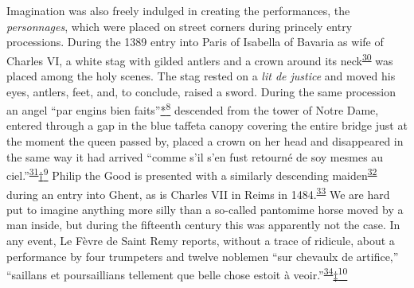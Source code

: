 Imagination was also freely indulged in creating the performances, the
\emph{personnages}, which were placed on street corners during princely
entry processions. During the 1389 entry into Paris of Isabella of
Bavaria as wife of Charles VI, a white stag with gilded antlers and a
crown around its
neck\textsuperscript{\protect\hypertarget{20_ILLUSTRATIONS_FOLLOW_PAGE.xhtmlux5cux23id_413}{\protect\hyperlink{23_NOTES.xhtmlux5cux23id_414}{30}}}
was placed among the holy scenes. The stag rested on a \emph{lit de
justice} and moved his eyes, antlers, feet, and, to conclude, raised a
sword. During the same procession an angel ``par engins bien
faits''\protect\hypertarget{20_ILLUSTRATIONS_FOLLOW_PAGE.xhtmlux5cux23id_2669}{\protect\hyperlink{23_NOTES.xhtmlux5cux23id_2670}{*\textsuperscript{8}}}
descended from the tower of Notre Dame, entered through a gap in the
blue taffeta canopy covering the entire bridge just at the moment the
queen passed by, placed a crown on her head and disappeared in the same
way it had arrived ``comme s'il s'en fust retourné de soy mesmes au
ciel.''\textsuperscript{\protect\hypertarget{20_ILLUSTRATIONS_FOLLOW_PAGE.xhtmlux5cux23id_411}{\protect\hyperlink{23_NOTES.xhtmlux5cux23id_412}{31}}}\protect\hypertarget{20_ILLUSTRATIONS_FOLLOW_PAGE.xhtmlux5cux23id_2671}{\protect\hyperlink{23_NOTES.xhtmlux5cux23id_2672}{†\textsuperscript{9}}}
Philip the Good is presented with a similarly descending
maiden\textsuperscript{\protect\hypertarget{20_ILLUSTRATIONS_FOLLOW_PAGE.xhtmlux5cux23id_409}{\protect\hyperlink{23_NOTES.xhtmlux5cux23id_410}{32}}}
during an entry into Ghent, as is Charles VII in Reims in
1484.\textsuperscript{\protect\hypertarget{20_ILLUSTRATIONS_FOLLOW_PAGE.xhtmlux5cux23id_407}{\protect\hyperlink{23_NOTES.xhtmlux5cux23id_408}{33}}}
We are hard put to imagine anything more silly than a so-called
pantomime horse moved by a man inside, but during the fifteenth century
this was apparently not the case. In any event, Le Fèvre de Saint Remy
reports, without a trace of ridicule, about a performance by four
trumpeters and twelve noblemen ``sur chevaulx de artifice,'' ``saillans
et poursaillians tellement que belle chose estoit à
veoir.''\textsuperscript{\protect\hypertarget{20_ILLUSTRATIONS_FOLLOW_PAGE.xhtmlux5cux23id_405}{\protect\hyperlink{23_NOTES.xhtmlux5cux23id_406}{34}}}\protect\hypertarget{20_ILLUSTRATIONS_FOLLOW_PAGE.xhtmlux5cux23id_2673}{\protect\hyperlink{23_NOTES.xhtmlux5cux23id_2674}{‡\textsuperscript{10}}}

